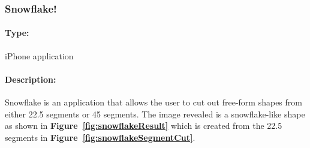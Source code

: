 \documentclass[11pt]{article}
\begin{document}
            \subsubsection{Snowflake!}
            
                \paragraph{Type:} iPhone application 
            
                \paragraph{Description:}
                Snowflake is an application that allows the user to cut out free-form shapes from either 22.5\textdegree{} segments or 45\textdegree{} segments. The image revealed is a snowflake-like shape as shown in \textbf{Figure~\ref{fig:snowflakeResult}} which is created from the 22.5\textdegree{} segments in \textbf{Figure~\ref{fig:snowflakeSegmentCut}}. 
                    
\end{document}
